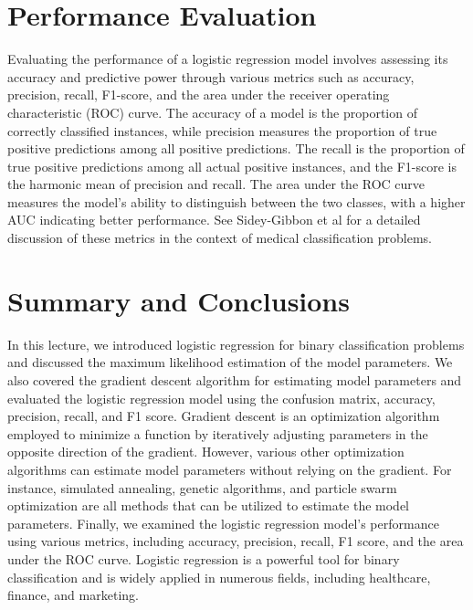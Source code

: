 \documentclass{article}[12pt]
\begin{document}
\section{Performance Evaluation}
Evaluating the performance of a logistic regression model involves assessing its accuracy and predictive power through various metrics such as accuracy, precision, recall, F1-score, and the area under the receiver operating characteristic (ROC) curve.
The accuracy of a model is the proportion of correctly classified instances, while precision measures the proportion of true positive predictions among all positive predictions. 
The recall is the proportion of true positive predictions among all actual positive instances, and the F1-score is the harmonic mean of precision and recall. 
The area under the ROC curve measures the model's ability to distinguish between the two classes, with a higher AUC indicating better performance.
See Sidey-Gibbon et al \cite{SG2019} for a detailed discussion of these metrics in the context of medical classification problems.

\section{Summary and Conclusions}
In this lecture, we introduced logistic regression for binary classification problems and discussed the maximum likelihood estimation of the model parameters. We also covered the gradient descent algorithm for estimating model parameters and evaluated the logistic regression model using the confusion matrix, accuracy, precision, recall, and F1 score. Gradient descent is an optimization algorithm employed to minimize a function by iteratively adjusting parameters in the opposite direction of the gradient. However, various other optimization algorithms can estimate model parameters without relying on the gradient. For instance, simulated annealing, genetic algorithms, and particle swarm optimization are all methods that can be utilized to estimate the model parameters. Finally, we examined the logistic regression model's performance using various metrics, including accuracy, precision, recall, F1 score, and the area under the ROC curve. Logistic regression is a powerful tool for binary classification and is widely applied in numerous fields, including healthcare, finance, and marketing.



\end{document}
